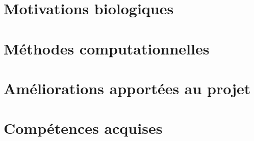 \setcounter{myfigure}{1}
\renewcommand{\caption}[1]{
  \vspace{0.5cm}
  \begin{quote}
    {{\sc Figure} \arabic{myfigure}: #1}
  \end{quote}
  \vspace{1cm}
  \stepcounter{myfigure}
}%
%

%
\renewcommand{\titlesize}{\Huge}%
\title{\Title}


\author{
{\FirstNameA\ \AuthorA\ } 
{\FirstNameB\ \AuthorB\ }
}

\institute{
{\InstituteA }
{\InstituteB }
}           

\conference{\Conference}
 
\maketitle

\begin{multicols*}{4}

\section{Motivations biologiques}
\ParagMotivBio
\columnbreak

\section{Méthodes computationnelles}
\ParagMethComp
\columnbreak

\section{Améliorations apportées au projet}
\ParagAmelio
\columnbreak

\section{Compétences acquises}
\ParagCompAcqu

\end{multicols*}

